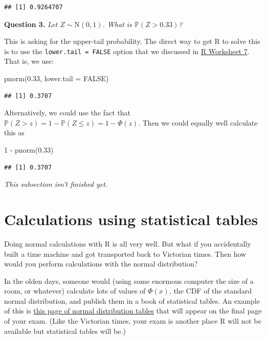 \documentclass[
  a4paper,
]{book}
\newenvironment{Shaded}{\begin{snugshade}}{\end{snugshade}}
\newcommand{\AttributeTok}[1]{\textcolor[rgb]{0.77,0.63,0.00}{#1}}
\newcommand{\ConstantTok}[1]{\textcolor[rgb]{0.00,0.00,0.00}{#1}}
\newcommand{\DecValTok}[1]{\textcolor[rgb]{0.00,0.00,0.81}{#1}}
\newcommand{\FloatTok}[1]{\textcolor[rgb]{0.00,0.00,0.81}{#1}}
\newcommand{\FunctionTok}[1]{\textcolor[rgb]{0.00,0.00,0.00}{#1}}
\newcommand{\NormalTok}[1]{#1}
\newcommand{\SpecialCharTok}[1]{\textcolor[rgb]{0.00,0.00,0.00}{#1}}
\theoremstyle{definition}
\theoremstyle{definition}
\theoremstyle{definition}
\theoremstyle{definition}
\theoremstyle{remark}
\begin{document}
\begin{verbatim}
## [1] 0.9264707
\end{verbatim}

\textbf{Question 3.} \emph{Let \(Z \sim \mathrm{N}(0,1)\). What is \(\mathbb P(Z > 0.33)\)?}

This is asking for the upper-tail probability. The direct way to get R to solve this is to use the \texttt{lower.tail\ =\ FALSE} option that we discussed in \protect\hyperlink{r-work}{R Worksheet 7}. That is, we use:

\begin{Shaded}
\begin{Highlighting}[]
\FunctionTok{pnorm}\NormalTok{(}\FloatTok{0.33}\NormalTok{, }\AttributeTok{lower.tail =} \ConstantTok{FALSE}\NormalTok{)}
\end{Highlighting}
\end{Shaded}

\begin{verbatim}
## [1] 0.3707
\end{verbatim}

Alternatively, we could use the fact that \(\mathbb P(Z > z) = 1 - \mathbb P(Z \leq z) = 1 - \Phi(z)\). Then we could equally well calculate this as

\begin{Shaded}
\begin{Highlighting}[]
\DecValTok{1} \SpecialCharTok{{-}} \FunctionTok{pnorm}\NormalTok{(}\FloatTok{0.33}\NormalTok{)}
\end{Highlighting}
\end{Shaded}

\begin{verbatim}
## [1] 0.3707
\end{verbatim}

\emph{This subsection isn't finished yet.}

\hypertarget{normal-tables}{%
\section{Calculations using statistical tables}\label{normal-tables}}

Doing normal calculations with R is all very well. But what if you accidentally built a time machine and got transported back to Victorian times. Then how would you perform calculations with the normal distribution?

In the olden days, someone would (using some enormous computer the size of a room, or whatever) calculate lots of values of \(\Phi(x)\), the CDF of the standard normal distribution, and publish them in a book of statistical tables. An example of this is \href{https://mpaldridge.github.io/math1710/stat-tab.pdf}{this page of normal distribution tables} that will appear on the final page of your exam. (Like the Victorian times, your exam is another place R will not be available but statistical tables will be.)
\end{document}
